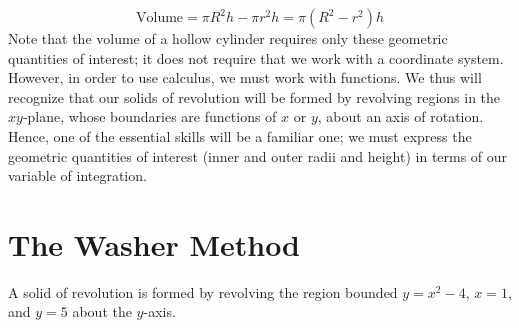 \documentclass{ximera}
\begin{document}
\begin{image}
            \end{image}
\[
\textrm{Volume} = \pi R^2h-\pi r^2h=\pi(R^2-r^2)h 
\]
Note that the volume of a hollow cylinder requires only these geometric quantities of interest; it does not require that we work with a coordinate system.  However, in order to use calculus, we must work with functions.  We thus will recognize that our solids of revolution will be formed by revolving regions in the $xy$-plane, whose boundaries are functions of $x$ or $y$, about an axis of rotation.  Hence, one of the essential skills will be a familiar one; we must express the geometric quantities of interest (inner and outer radii and height) in terms of our variable of integration.

\section{The Washer Method}

A solid of revolution is formed by revolving the region bounded $y=x^2-4$, $x=1$, and $y=5$ about the $y$-axis.  
\end{document}
